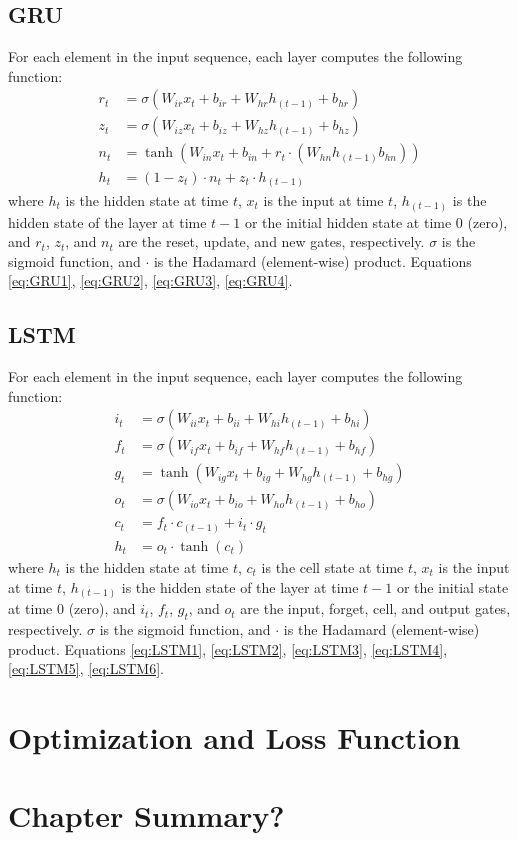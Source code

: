 \subsection{GRU}
For each element in the input sequence, each layer computes the following function:
\begin{align}
	r_{t} &= \sigma\left(W_{ir}x_{t} + b_{ir} + W_{hr}h_{\left(t-1\right)} + b_{hr}\right) \label{eq:GRU1} \\
	z_{t} &= \sigma\left(W_{iz}x_{t} + b_{iz} + W_{hz}h_{\left(t-1\right)} + b_{hz}\right) \label{eq:GRU2} \\
	n_{t} &= \tanh\left(W_{in}x_{t} + b_{in} + r_{t} \cdot \left(W_{hn}h_{\left(t-1\right)} b_{hn}\right)\right) \label{eq:GRU3} \\
	h_{t} &= \left(1 - z_{t}\right) \cdot n_{t} + z_{t} \cdot h_{\left(t-1\right)} \label{eq:GRU4}
\end{align}
where $h_{t}$ is the hidden state at time $t$, $x_{t}$ is the input at time $t$, $h_{\left(t-1\right)}$ is the hidden state of the layer at time $t-1$ or the initial hidden state at time 0 (zero), and $r_{t}$, $z_{t}$, and $n_{t}$ are the reset, update, and new gates, respectively. $\sigma$ is the sigmoid function, and $\cdot$ is the Hadamard (element-wise) product. Equations \ref{eq:GRU1}, \ref{eq:GRU2}, \ref{eq:GRU3}, \ref{eq:GRU4}.

\subsection{LSTM}
For each element in the input sequence, each layer computes the following function:
\begin{align}
	i_{t} &= \sigma\left(W_{ii}x_{t} + b_{ii} + W_{hi}h_{\left(t-1\right)} + b_{hi}\right) \label{eq:LSTM1} \\
	f_{t} &= \sigma\left(W_{if}x_{t} + b_{if} + W_{hf}h_{\left(t-1\right)} + b_{hf}\right) \label{eq:LSTM2} \\
	g_{t} &= \tanh\left(W_{ig}x_{t} + b_{ig} + W_{hg}h_{\left(t-1\right)} + b_{hg}\right) \label{eq:LSTM3} \\
	o_{t} &= \sigma\left(W_{io}x_{t} + b_{io} + W_{ho}h_{\left(t-1\right)} + b_{ho}\right) \label{eq:LSTM4} \\
	c_{t} &= f_{t} \cdot c_{\left(t-1\right)} + i_{t} \cdot g_{t} \label{eq:LSTM5} \\
	h_{t} &= o_{t} \cdot \tanh\left(c_{t}\right) \label{eq:LSTM6}
\end{align}
where $h_{t}$ is the hidden state at time $t$, $c_{t}$ is the cell state at time $t$, $x_{t}$ is the input at time $t$, $h_{\left(t-1\right)}$ is the hidden state of the layer at time $t-1$ or the initial state at time 0 (zero), and $i_{t}$, $f_{t}$, $g_{t}$, and $o_{t}$ are the input, forget, cell, and output gates, respectively. $\sigma$ is the sigmoid function, and $\cdot$ is the Hadamard (element-wise) product. Equations \ref{eq:LSTM1}, \ref{eq:LSTM2}, \ref{eq:LSTM3}, \ref{eq:LSTM4}, \ref{eq:LSTM5}, \ref{eq:LSTM6}.

\section{Optimization and Loss Function}

\section{Chapter Summary?}